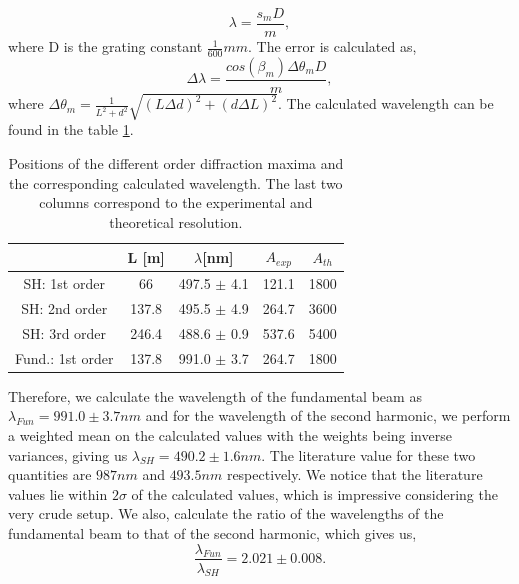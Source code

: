 \begin{equation}
    \lambda = \frac{s_m D}{m},
\end{equation}
where D is the grating constant $\frac{1}{600} mm$. The error is calculated as,
\begin{equation}
    \Delta\lambda = \frac{cos(\beta_m)\Delta\theta_m D}{m},
\end{equation}
where $\Delta\theta_m = \frac{1}{L^2 + d^2}\sqrt{(L\Delta d)^2 + (d \Delta L)^2}$. The calculated wavelength can be found in the table \ref{tab:diffgrat}.
\begin{table}[]
    \centering
    \begin{tabular}{c|cccc}
         & L [m] & $\lambda$[nm] & $A_{exp}$ & $A_{th}$ \\
        \hline
        SH: 1st order & 66 & 497.5 $\pm$ 4.1 & 121.1 & 1800 \\
        SH: 2nd order & 137.8 & 495.5 $\pm$ 4.9 & 264.7 & 3600 \\
        SH: 3rd order & 246.4 & 488.6 $\pm$ 0.9 & 537.6 & 5400 \\
        Fund.: 1st order & 137.8 & 991.0 $\pm$ 3.7 & 264.7 & 1800
    \end{tabular}
    \caption{Positions of the different order diffraction maxima and the corresponding calculated wavelength. The last two columns correspond to the experimental and theoretical resolution.}
    \label{tab:diffgrat}
\end{table}
Therefore, we calculate the wavelength of the fundamental beam as $\lambda_{Fun} = 991.0 \pm 3.7 nm$ and for the wavelength of the second harmonic, we perform a weighted mean on the calculated values with the weights being inverse variances, giving us $\lambda_{SH} = 490.2 \pm 1.6 nm$. The literature value for these two quantities are $987nm$ and $493.5nm$ respectively. We notice that the literature values lie within $2\sigma$ of the calculated values, which is impressive considering the very crude setup. We also, calculate the ratio of the wavelengths of the fundamental beam to that of the second harmonic, which gives us,
\begin{equation}
    \frac{\lambda_{Fun}}{\lambda_{SH}} = 2.021 \pm 0.008.
\end{equation}
